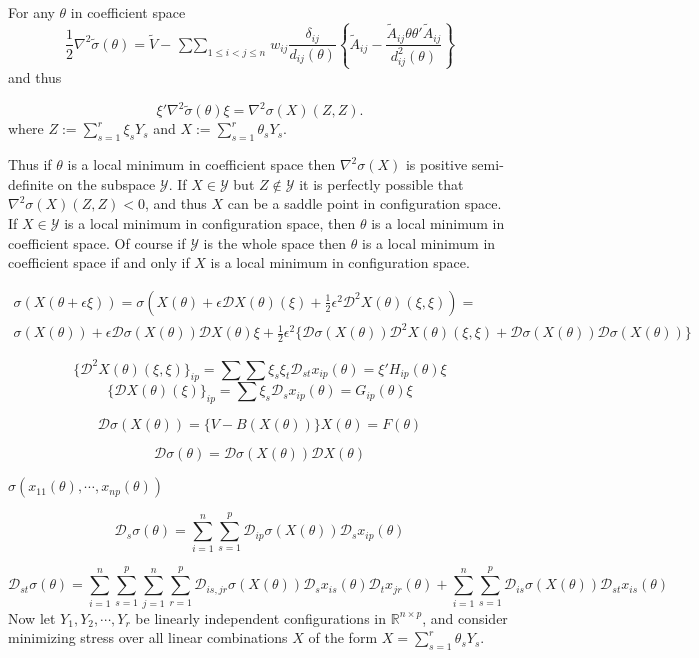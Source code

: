 \documentclass[
  12pt,
]{book}
\theoremstyle{definition}
\theoremstyle{definition}
\theoremstyle{definition}
\theoremstyle{definition}
\theoremstyle{remark}
\begin{document}
For any \(\theta\) in coefficient space
\[
\frac12\nabla^2\tilde\sigma(\theta)=\tilde V-\mathop{\sum\sum}_{1\leq i<j\leq n}w_{ij}\frac{\delta_{ij}}{d_{ij}(\theta)}\left\{\tilde A_{ij}-\frac{\tilde A_{ij}\theta\theta'\tilde A_{ij}}{d_{ij}^2(\theta)}\right\}
\]
and thus

\[
\xi'\nabla^2\tilde\sigma(\theta)\xi=\nabla^2\sigma(X)(Z,Z).
\]
where \(Z:=\sum_{s=1}^r\xi_s Y_s\) and \(X:=\sum_{s=1}^r\theta_s Y_s\).

Thus if \(\theta\) is a local minimum in coefficient space then \(\nabla^2\sigma(X)\) is positive semi-definite on
the subspace \(\mathcal{Y}\). If \(X\in\mathcal{Y}\) but \(Z\not\in\mathcal{Y}\) it is perfectly possible that
\(\nabla^2\sigma(X)(Z,Z)<0\), and thus \(X\) can be a saddle point in
configuration space. If \(X\in\mathcal{Y}\) is a local minimum in
configuration space, then \(\theta\) is a local minimum in coefficient
space. Of course if \(\mathcal{Y}\) is the whole space then \(\theta\)
is a local minimum in coefficient space if and only if \(X\) is a local minimum
in configuration space.

\begin{multline}
\sigma(X(\theta+\epsilon\xi))=\sigma(X(\theta)+\epsilon\mathcal{D}X(\theta)(\xi)+\frac12\epsilon^2\mathcal{D}^2X(\theta)(\xi,\xi))=\\
\sigma(X(\theta))+\epsilon\mathcal{D}\sigma(X(\theta))\mathcal{D}X(\theta)\xi+\frac12\epsilon^2\{\mathcal{D}\sigma(X(\theta))\mathcal{D}^2X(\theta)(\xi,\xi)+\mathcal{D}\sigma(X(\theta))\mathcal{D}\sigma(X(\theta))\}
\end{multline}

\[
\{\mathcal{D}^2X(\theta)(\xi,\xi)\}_{ip}=\sum\sum\xi_s\xi_t\mathcal{D}_{st}x_{ip}(\theta)=\xi'H_{ip}(\theta)\xi
\]
\[
\{\mathcal{D}X(\theta)(\xi)\}_{ip}=\sum\xi_s\mathcal{D}_sx_{ip}(\theta)=G_{ip}(\theta)\xi
\]

\[
\mathcal{D}\sigma(X(\theta))=\{V-B(X(\theta))\}X(\theta)=F(\theta)
\]

\[
\mathcal{D}\sigma(\theta)=\mathcal{D}\sigma(X(\theta))\mathcal{D}X(\theta)
\]

\(\sigma(x_{11}(\theta),\cdots,x_{np}(\theta))\)

\[
\mathcal{D}_s\sigma(\theta)=\sum_{i=1}^n\sum_{s=1}^p\mathcal{D}_{ip}\sigma(X(\theta))\mathcal{D}_sx_{ip}(\theta)
\]

\[
\mathcal{D}_{st}\sigma(\theta)=\sum_{i=1}^n\sum_{s=1}^p
\sum_{j=1}^n\sum_{r=1}^p\mathcal{D}_{is,jr}\sigma(X(\theta))\mathcal{D}_sx_{is}(\theta)\mathcal{D}_tx_{jr}(\theta)
+\sum_{i=1}^n\sum_{s=1}^p\mathcal{D}_{is}\sigma(X(\theta))\mathcal{D}_{st}x_{is}(\theta)
\]
Now let \(Y_1,Y_2,\cdots,Y_r\) be linearly independent configurations in \(\mathbb{R}^{n\times p}\), and consider minimizing stress over all linear combinations \(X\) of the form \(X=\sum_{s=1}^r \theta_sY_s\).
\end{document}
